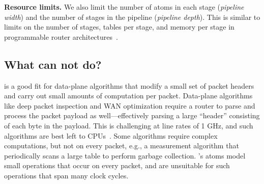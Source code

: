 \medskip
\noindent
\textbf{Resource limits.} We also limit the number of atoms in each stage
(\textit{pipeline width}) and the number of stages in the pipeline
(\textit{pipeline depth}). This is similar to limits on the number of stages,
tables per stage, and memory per stage in programmable router
architectures~\cite{lavanya_compiler}.

\subsection{What can \absmachine not do?}
\label{domino_ss:limitations}

\absmachine is a good fit for data-plane algorithms that modify a small set of
packet headers and carry out small amounts of computation per packet.
Data-plane algorithms like deep packet inspection and WAN optimization require
a router to parse and process the packet payload as well---effectively parsing
a large ``header'' consisting of each byte in the payload. This is challenging
at line rates of 1 GHz, and such algorithms are best left to CPUs~\cite{e2}.
Some algorithms require complex computations, but not on every packet, e.g., a
measurement algorithm that periodically scans a large table to perform garbage
collection.  \absmachine's atoms model small operations that occur on every
packet, and are unsuitable for such operations that span many clock cycles.
